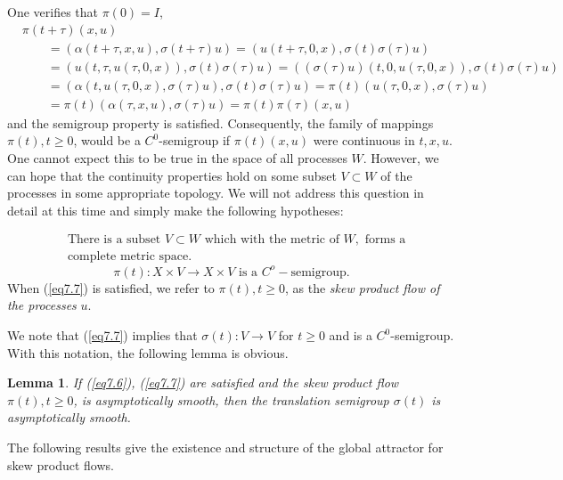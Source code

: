 \documentclass{surv-l}
\theoremstyle{plain}
\newtheorem{lemma}[theorem]{Lemma}
\theoremstyle{definition}
\numberwithin{equation}{section}
\numberwithin{figure}{chapter}
\begin{document}
One verifies that $\pi(0)=I$,
\begin{align*}
&\pi(t+\tau) (x,u)\\
& \qquad =(\alpha(t+\tau,x,u),\sigma(t+\tau)u)=(u(t+\tau,0,x),\sigma(t)\sigma(\tau)u)\\
& \qquad =(u(t,\tau,u(\tau,0,x)),\sigma(t)\sigma(\tau)u)=((\sigma(\tau)u)(t,0, u(\tau,0,x)),\sigma(t)\sigma(\tau)u)\\
& \qquad =(\alpha(t,u(\tau,0,x),\sigma(\tau)u),\sigma(t)\sigma(\tau)u)=\pi(t)(u(\tau,0,x),\sigma(\tau)u)\\
& \qquad =\pi(t)(\alpha(\tau,x,u),\sigma(\tau)u)=\pi(t)\pi(\tau)(x,u)
\end{align*}
and the semigroup property is satisfied. Consequently, the family of mappings $\pi(t),t\geq 0$, would be a $C^{0}$-semigroup if $\pi(t)(x,u)$ were continuous in $t,x,u$. One cannot expect this to be true in the space of all processes $W$. However, we can hope that the continuity properties hold on some subset $V\subset W$ of the processes in some appropriate topology. We will not address this question in detail at this time and simply make the following hypotheses:

\begin{equation}\label{eq7.6}
\begin{split}
&\text{There is a subset }V\subset W\text{ which with the metric of }W, \text{ forms a}\\
&\text{complete metric space}.
\end{split}
\end{equation}
\begin{equation}\label{eq7.7}
\pi(t)\!:X\times V\rightarrow X\times V\text{ is a }C^{o}-\text{semigroup}.
\end{equation}
When (\ref{eq7.7}) is satisfied, we refer to $\pi(t),t\geq 0$, as the \emph{skew product flow of the processes} $u$.

We note that (\ref{eq7.7}) implies that $\sigma(t)\!:V\rightarrow V$ for $t\geq 0$ and is a $C^{0}$-semigroup. With this notation, the following lemma is obvious.

\begin{lemma}\label{lem3.7.1} If \emph{(\ref{eq7.6})}, \emph{(\ref{eq7.7})} are satisfied and the skew product flow $\pi(t),t\geq 0$, is asymptotically smooth, then the translation semigroup $\sigma(t)$ is asymptotically smooth.
\end{lemma}

The following results give the existence and structure of the global attractor for skew product flows.
\end{document}
